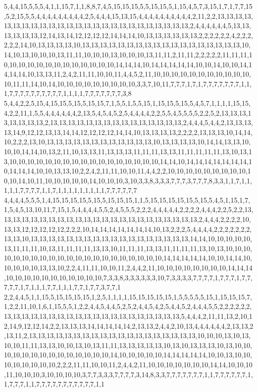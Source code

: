 5,4,4,15,5,5,5,4,1,1,15,7,1,1,8,8,7,4,5,15,15,15,5,5,15,15,5,1,15,4,5,7,3,15,1,7,1,7,7,15,5,2,15,5,5,4,4,4,4,4,4,4,4,4,2,5,4,4,4,15,13,15,4,4,4,4,4,4,4,4,4,4,2,11,2,2,13,13,13,13,13,13,13,13,13,13,13,13,13,13,13,13,13,13,13,13,13,13,13,13,13,2,4,4,4,4,4,4,5,13,13,13,13,13,13,12,14,13,14,12,12,12,12,14,14,14,10,13,13,13,13,13,13,2,2,2,2,2,2,4,2,2,2,2,2,2,14,10,13,13,13,13,10,13,13,13,13,13,13,13,13,13,13,13,13,13,13,13,13,13,13,10,14,10,13,10,10,10,13,11,11,10,10,10,13,10,10,10,13,11,11,2,11,11,2,2,2,2,2,11,11,11,10,10,10,10,10,10,10,10,10,10,10,10,10,14,14,14,10,14,14,14,14,14,10,10,14,10,10,14,14,14,14,10,13,13,11,2,4,2,11,11,10,10,11,4,4,5,2,11,10,10,10,10,10,10,10,10,10,10,10,10,11,11,14,10,14,10,10,10,10,10,10,10,10,10,3,3,7,10,11,7,7,7,1,7,1,7,7,7,7,7,7,7,1,1,1,7,7,7,7,7,7,7,7,7,7,1,1,1,1,7,7,7,7,7,7,7,3,8
5,4,4,2,2,5,15,4,15,15,5,15,5,15,15,7,1,5,5,1,5,5,15,1,15,15,5,15,5,4,5,7,1,1,1,1,15,15,4,2,2,11,1,5,5,4,4,4,4,4,4,2,13,5,4,5,4,5,2,5,4,4,4,4,2,2,5,5,4,5,5,5,5,2,2,5,2,13,13,13,13,13,13,13,13,2,13,13,13,13,13,13,13,13,13,13,13,13,13,13,13,2,4,4,4,5,4,4,2,13,13,13,13,14,9,12,12,13,13,14,14,12,12,12,12,14,14,10,13,13,13,13,2,2,2,2,13,13,13,10,14,14,10,2,2,2,13,10,13,13,13,13,13,13,13,13,13,13,13,13,10,13,13,13,13,10,14,14,13,13,10,10,10,14,14,10,13,2,11,10,13,13,11,13,13,13,11,11,11,13,13,11,11,11,11,11,13,10,13,13,10,10,10,10,10,10,10,10,10,10,10,10,10,10,10,10,10,14,14,10,14,14,14,14,14,14,14,10,14,14,14,10,10,13,13,10,2,2,4,2,11,11,10,10,11,4,4,2,2,10,10,10,10,10,10,10,10,10,10,10,14,10,11,10,10,10,10,10,14,10,10,10,3,10,3,3,8,3,3,3,7,7,7,3,7,7,7,8,3,3,1,1,7,1,1,1,1,1,7,7,7,7,1,1,7,1,1,1,1,1,1,1,1,1,7,7,7,7,7,7
4,4,4,4,5,5,5,1,4,15,15,15,15,5,15,5,15,15,15,1,1,5,15,15,15,15,15,5,15,5,4,5,1,15,1,7,1,5,4,5,13,10,11,7,15,1,5,4,4,4,4,5,5,2,4,5,5,5,2,2,2,4,4,4,4,4,2,2,2,2,4,4,4,2,2,5,2,2,13,13,13,13,13,13,13,13,13,13,13,13,13,13,13,13,13,13,13,13,13,13,13,2,4,4,4,2,2,2,2,10,13,13,12,12,12,12,12,2,2,2,10,14,14,14,14,14,14,14,10,13,2,2,2,5,4,4,4,4,2,2,2,2,2,2,2,13,13,10,13,13,13,13,13,13,13,13,13,13,13,13,13,13,13,13,13,13,14,14,10,10,10,10,10,13,11,11,11,10,13,11,11,11,11,13,13,10,11,11,11,13,13,11,11,11,11,13,10,13,10,10,10,10,10,10,10,10,10,10,10,10,10,10,10,10,10,10,10,10,10,14,14,14,14,14,10,10,14,14,10,10,10,10,10,13,13,10,2,2,4,11,11,10,10,11,2,4,4,2,11,10,10,10,10,10,10,10,10,14,14,14,10,10,10,10,10,10,10,10,10,10,10,7,3,3,8,3,3,3,3,3,3,10,7,3,3,3,3,7,7,7,7,1,7,7,7,1,7,7,7,7,7,1,7,1,1,1,7,7,1,1,1,7,7,1,7,7,3,7,7,1
2,2,4,4,5,1,1,15,5,15,15,15,15,1,2,5,1,1,1,1,15,15,15,15,15,1,5,5,5,5,5,15,1,15,15,15,7,1,2,2,11,10,1,6,1,15,5,5,1,2,2,4,4,5,4,4,5,2,5,2,4,4,5,4,2,5,4,4,5,2,4,4,4,5,5,2,2,2,2,2,2,13,13,13,13,13,13,13,13,13,13,13,13,13,13,13,13,13,13,13,13,5,4,4,4,2,11,11,13,2,10,12,14,9,12,12,14,2,2,13,13,13,14,14,14,14,14,2,13,13,2,4,4,2,10,13,4,4,4,4,4,4,2,13,13,2,13,11,2,13,13,13,13,13,13,13,13,13,13,13,13,13,13,13,13,13,13,13,10,10,10,13,10,13,10,10,11,11,13,13,10,10,13,10,13,11,11,13,13,13,13,13,10,13,10,13,13,13,10,13,10,10,10,10,10,10,10,10,10,10,10,10,10,10,14,10,10,10,10,10,14,14,14,14,14,10,10,13,10,10,10,10,10,10,10,10,2,2,2,11,11,10,10,11,2,4,4,2,11,10,10,10,10,10,10,10,14,14,10,10,10,11,10,10,10,3,10,10,10,10,3,7,7,3,3,3,7,7,7,7,3,14,8,3,3,7,7,7,7,7,7,7,1,1,7,7,7,7,7,7,1,1,7,7,7,1,1,7,7,7,7,7,7,7,7,7,7,7,1,1

